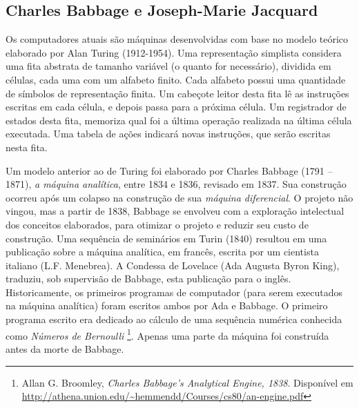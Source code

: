 \begin{citacao}
\end{citacao}

\subsection{Charles Babbage e Joseph-Marie Jacquard}

Os computadores atuais são máquinas desenvolvidas com base no modelo teórico elaborado por Alan Turing (1912-1954). Uma representação simplista considera uma fita abstrata de tamanho variável (o quanto for necessário), dividida em células, cada uma com um alfabeto finito. Cada alfabeto possui uma quantidade de símbolos de representação finita. Um cabeçote leitor desta fita lê as instruções escritas em cada célula, e depois passa para a próxima célula. Um registrador de estados desta fita, memoriza qual foi a última operação realizada na última célula executada. Uma tabela de ações indicará novas instruções, que serão escritas nesta fita.

 Um modelo anterior ao de Turing foi elaborado por Charles Babbage (1791 -- 1871), \emph{a máquina analítica},  entre 1834 e 1836, revisado em 1837. Sua construção ocorreu após um colapso na construção de sua \emph{máquina diferencial}. O projeto não vingou, mas a partir de 1838, Babbage se envolveu com a exploração intelectual dos conceitos elaborados, para otimizar o projeto e reduzir seu custo de construção. Uma sequência de seminários em Turin (1840) resultou em uma publicação sobre a máquina analítica, em francês, escrita por um cientista italiano (L.F. Menebrea). A Condessa de Lovelace (Ada Augusta Byron King), traduziu, sob supervisão de Babbage, esta publicação para o inglês. Historicamente, os primeiros programas de computador (para serem executados na máquina analítica) foram escritos ambos por Ada e Babbage. O primeiro programa escrito era dedicado ao cálculo de uma sequência numérica conhecida como \emph{Números de Bernoulli} \footnote{Allan G. Broomley, \emph{Charles Babbage’s Analytical Engine, 1838}. Disponível em \url{http://athena.union.edu/~hemmendd/Courses/cs80/an-engine.pdf}}. Apenas uma parte da máquina foi construída antes da morte de Babbage.

